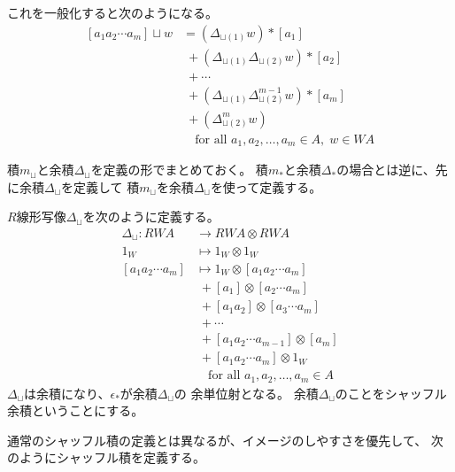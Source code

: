 		これを一般化すると次のようになる。
		\begin{equation*}\begin{split} %
			[a_1a_2\cdots a_m]\sqcup w
			& = (\Delta_{\sqcup(1)}w)*[a_1] \\
			&\; + (\Delta_{\sqcup(1)}\Delta_{\sqcup(2)}w)*[a_2] \\
			&\; + \cdots \\
			&\; + (\Delta_{\sqcup(1)}\Delta_{\sqcup(2)}^{m-1}w)*[a_{m}] \\
			&\; + (\Delta_{\sqcup(2)}^{m}w) \\
			&\quad\text{for all }a_1,a_2,\dots,a_m\in A,\;w\in WA
		\end{split}\end{equation*} %


		積$m_\sqcup$と余積$\Delta_\sqcup$を定義の形でまとめておく。
		積$m_*$と余積$\Delta_*$の場合とは逆に、先に余積$\Delta_\sqcup$を定義して
		積$m_\sqcup$を余積$\Delta_\sqcup$を使って定義する。
		\begin{definition}[シャッフル積に双対な余積]\label{def:シャッフル積に双対な余積} %
			$R$線形写像$\Delta_\sqcup$を次のように定義する。
			\begin{equation*}\begin{split} %
				\Delta_\sqcup: RWA &\to RWA\otimes RWA \\
				1_W &\mapsto 1_W\otimes 1_W \\
				[a_1a_2\cdots a_m] 
				& \mapsto 1_W\otimes [a_1a_2\cdots a_m] \\
				&\; + [a_1]\otimes [a_2\cdots a_m] \\
				&\; + [a_1a_2]\otimes [a_3\cdots a_m] \\
				&\; + \cdots \\
				&\; + [a_1a_2\cdots a_{m-1}]\otimes [a_m] \\
				&\; + [a_1a_2\cdots a_m]\otimes 1_W \\
				&\quad\text{for all }a_1,a_2,\dots,a_m\in A
			\end{split}\end{equation*} %
			$\Delta_\sqcup$は余積になり、$\epsilon_*$が余積$\Delta_\sqcup$の
			余単位射となる。
			余積$\Delta_\sqcup$のことをシャッフル余積ということにする。
		\end{definition} %
		通常のシャッフル積の定義とは異なるが、イメージのしやすさを優先して、
		次のようにシャッフル積を定義する。
